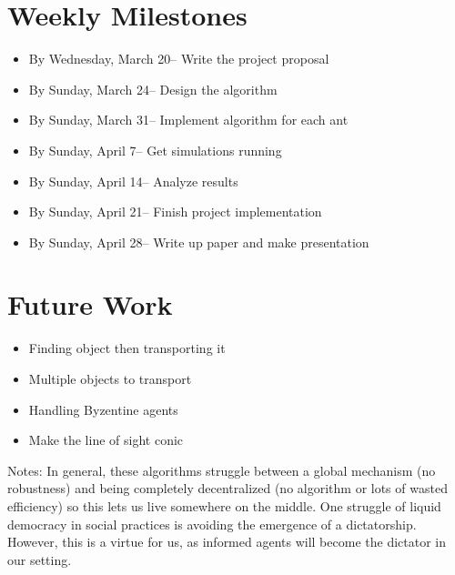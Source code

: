 \documentclass[12pt]{article}
\begin{document}
\section{Weekly Milestones}
\begin{itemize}
\item By Wednesday, March 20-- Write the project proposal
\item By Sunday, March 24-- Design the algorithm
\item By Sunday, March 31-- Implement algorithm for each ant
\item By Sunday, April 7-- Get simulations running
\item By Sunday, April 14-- Analyze results
\item By Sunday, April 21-- Finish project implementation
\item By Sunday, April 28-- Write up paper and make presentation
\end{itemize}

\section{Future Work}
\begin{itemize}
\item Finding object then transporting it
\item Multiple objects to transport
\item Handling Byzentine agents
\item Make the line of sight conic
\end{itemize}

Notes:
In general, these algorithms struggle between a global mechanism (no robustness) and being completely decentralized (no algorithm or lots of wasted efficiency) so this lets us live somewhere on the middle.
One struggle of liquid democracy in social practices is avoiding the emergence of a dictatorship.
However, this is a virtue for us, as informed agents will become the dictator in our setting.



\end{document}
